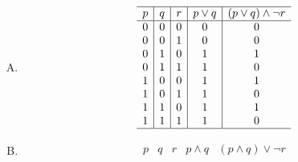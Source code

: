 {{\begin{practices}
\begin{enumerate}[A.]
{\begin{table}[H]
\[\begin{array}{c|c|c|c|c}
                                0 & 1 & 1 & 0 & 0 \\
                                1 & 0 & 0 & 0 & 0 \\
                                1 & 0 & 1 & 0 & 0 \\
                                1 & 1 & 0 & 1 & 0 \\
                                1 & 1 & 1 & 1 & 1 \\
                                \hline
                            \end{array}
                        \]
                    \end{table}
                }
                \item
                {
                    \begin{table}[H]
                        \[
                            \begin{array}{c|c|c|c|c}
                                \hline
                                p & q & r & p \vee q & (p \vee q) \wedge \neg r \\
                                \hline
                                0 & 0 & 0 & 0 & 0 \\
                                0 & 0 & 1 & 0 & 0 \\
                                0 & 1 & 0 & 1 & 1 \\
                                0 & 1 & 1 & 1 & 0 \\
                                1 & 0 & 0 & 1 & 1 \\
                                1 & 0 & 1 & 1 & 0 \\
                                1 & 1 & 0 & 1 & 1 \\
                                1 & 1 & 1 & 1 & 0 \\
                                \hline
                            \end{array}
                        \]
                    \end{table}
                }
                \item
                {
                    \begin{table}[H]
                        \[
                            \begin{array}{c|c|c|c|c}
                                \hline
                                p & q & r & p \wedge q & (p \wedge q) \vee \neg r \\

\end{array}\]
\end{table}}
\end{enumerate}
\end{practices}}}
